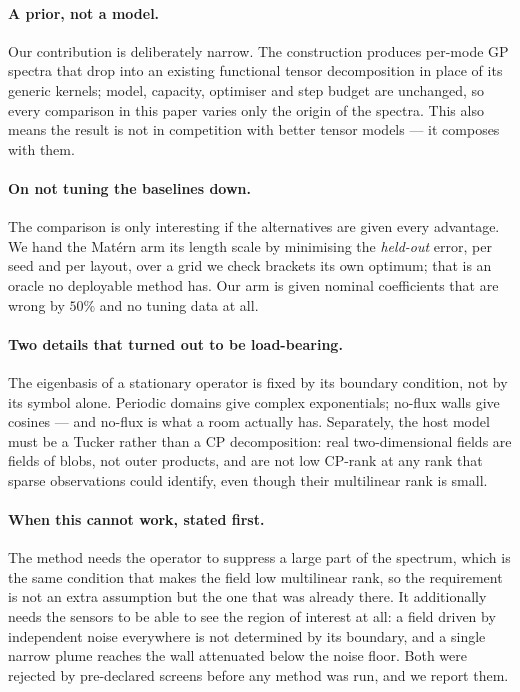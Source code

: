 \paragraph{A prior, not a model.}
Our contribution is deliberately narrow.  The construction produces per-mode GP
spectra that drop into an existing functional tensor decomposition in place of
its generic kernels; model, capacity, optimiser and step budget are unchanged, so
every comparison in this paper varies only the origin of the spectra.  This also
means the result is not in competition with better tensor models --- it composes
with them.

\paragraph{On not tuning the baselines down.}
The comparison is only interesting if the alternatives are given every
advantage.  We hand the Mat\'ern arm its length scale by minimising the
\emph{held-out} error, per seed and per layout, over a grid we check brackets its
own optimum; that is an oracle no deployable method has.  Our arm is given
nominal coefficients that are wrong by $50\%$ and no tuning data at all.

\paragraph{Two details that turned out to be load-bearing.}
The eigenbasis of a stationary operator is fixed by its boundary condition, not
by its symbol alone.  Periodic domains give complex exponentials; no-flux walls
give cosines --- and no-flux is what a room actually has.  Separately, the host
model must be a Tucker rather than a CP decomposition: real two-dimensional
fields are fields of blobs, not outer products, and are not low CP-rank at any
rank that sparse observations could identify, even though their multilinear rank
is small.

\paragraph{When this cannot work, stated first.}
The method needs the operator to suppress a large part of the spectrum, which is
the same condition that makes the field low multilinear rank, so the requirement
is not an extra assumption but the one that was already there.  It additionally
needs the sensors to be able to see the region of interest at all: a field driven
by independent noise everywhere is not determined by its boundary, and a single
narrow plume reaches the wall attenuated below the noise floor.  Both were
rejected by pre-declared screens before any method was run, and we report them.

